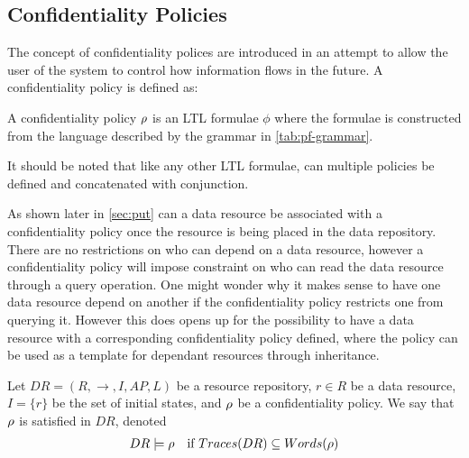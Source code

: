 \subsection{Confidentiality Policies}
The concept of confidentiality polices are introduced in an attempt to allow the user of the system to control how information flows in the future. A confidentiality policy is defined as:
\begin{definition}\label{def:cp}
A confidentiality policy $\rho$ is an LTL formulae $\phi$ where the formulae is constructed from the language described by the grammar in \autoref{tab:pf-grammar}.
\end{definition}
It should be noted that like any other LTL formulae, can multiple policies be defined and concatenated with conjunction.

As shown later in \autoref{sec:put} can a data resource be associated with a confidentiality policy once the resource is being placed in the data repository. There are no restrictions on who can depend on a data resource, however a confidentiality policy will impose constraint on who can read the data resource through a query operation. One might wonder why it makes sense to have one data resource depend on another if the confidentiality policy restricts one from querying it. However this does opens up for the possibility to have a data resource with a corresponding confidentiality policy defined, where the policy can be used as a template for dependant resources through inheritance.

\begin{definition}\label{def:scp}
Let $DR = \left(R, \longrightarrow, I, AP, L \right)$ be a resource repository, $r \in R$ be a data resource, $I = \{r\}$ be the set of initial states, and $\rho$ be a confidentiality policy. We say that $\rho$ is satisfied in $DR$, denoted
\begin{align*}
    DR \models \rho \quad \text{if } Traces(DR) \subseteq Words(\rho)
\end{align*}
\end{definition}


